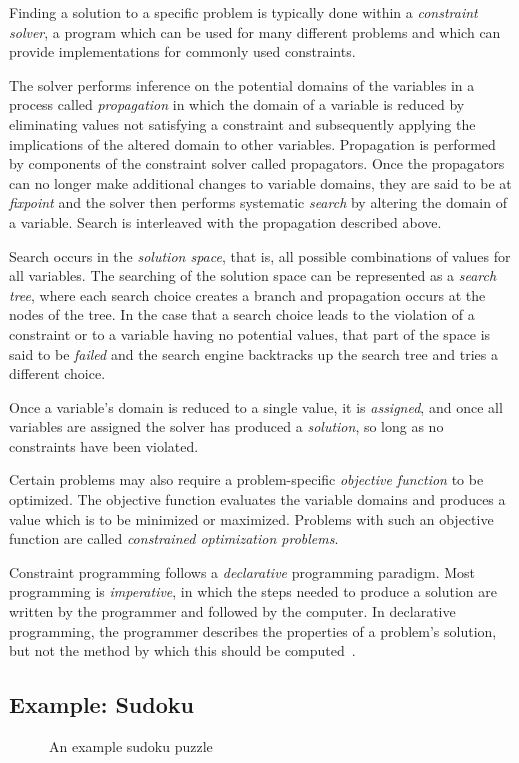 \documentclass[a4paper,10pt,twoside,openright]{book}
\begin{document}
Finding a solution to a specific problem is typically done within a \textit{constraint solver}, a program which can be used for many different problems and which can provide implementations for commonly used constraints.

The solver performs inference on the potential domains of the variables in a process called \textit{propagation} in which the domain of a variable is reduced by eliminating values not satisfying a constraint and subsequently applying the implications of the altered domain to other variables.  
Propagation is performed by components of the constraint solver called propagators.
Once the propagators can no longer make additional changes to variable domains, they are said to be at \textit{fixpoint} and the solver then performs systematic \textit{search} by altering the domain of a variable. Search is interleaved with the propagation described above.

Search occurs in the \textit{solution space}, that is, all possible combinations of values for all variables. 
The searching of the solution space can be represented as a \textit{search tree}, where each search choice creates a branch and propagation occurs at the nodes of the tree.
In the case that a search choice leads to the violation of a constraint or to a variable having no potential values, that part of the space is said to be \textit{failed} and the search engine backtracks up the search tree and tries a different choice. 

Once a variable's domain is reduced to a single value, it is \textit{assigned}, and once all variables are assigned the solver has produced a \textit{solution}, so long as no constraints have been violated.

Certain problems may also require a problem-specific \textit{objective function} to be optimized. The objective function evaluates the variable domains and produces a value which is to be minimized or maximized. Problems with such an objective function are called \textit{constrained optimization problems}.

Constraint programming follows a \textit{declarative} programming paradigm. Most programming is \textit{imperative}, in which the steps needed to produce a solution are written by the programmer and followed by the computer. In declarative programming, the programmer describes the properties of a problem's solution, but not the method by which this should be computed~\cite{declarative}.

\subsection{Example: Sudoku}
\begin{figure}
    \centering
    
    \caption{An example sudoku puzzle}
    \label{fig:sudoku}
\end{figure}
\end{document}
